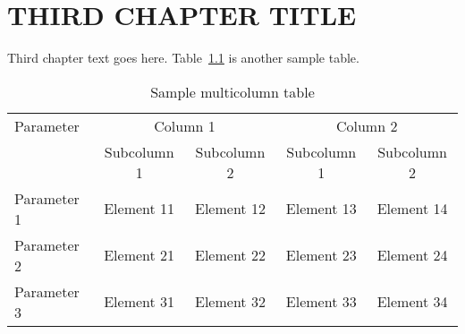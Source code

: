  \chapter{THIRD CHAPTER TITLE}\label{chap:chap3}
 Third chapter text goes here.  Table~\ref{tbl:chap3:table1} is another sample table.
\begin{table}[h]
\caption{Sample multicolumn table}
\begin{center}
  \begin{tabular}{|l|cc|cc|}
    \hline
  Parameter & \multicolumn{2}{c|}{Column 1} & \multicolumn{2}{c|}{Column 2}\\ \cline{2-5}
              & Subcolumn 1 & Subcolumn 2 & Subcolumn 1 & Subcolumn 2 \\
\hline
    Parameter 1 & Element 11 & Element 12 & Element 13 & Element 14\\
    Parameter 2 & Element 21 & Element 22 & Element 23 & Element 24\\
    Parameter 3 & Element 31 & Element 32 & Element 33 & Element 34\\
    \hline
\end{tabular} \label{tbl:chap3:table1}
\end{center}
\end{table}
